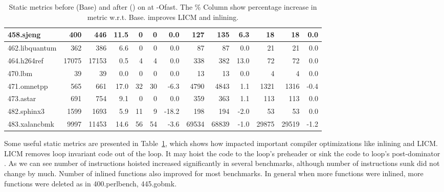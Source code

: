 \documentclass[acmlarge,review,anonymous]{acmart}\settopmatter{printfolios=true}
\begin{document}
\begin{table}[h!]
\begin{center}
{\begin{tabular}{|l|r|r|r|r|r|r|r|r|r|r|r|r|}
 458.sjeng	  & 400	        & 446	& 11.5& 0	& 0	& 0.0  & 127	& 135	  & 6.3 & 18	& 18	& 0.0  \\\hline
 462.libquantum   & 362	        & 386	& 6.6 & 0 	& 0	& 0.0  & 87	& 87	  & 0.0 & 21	& 21	& 0.0  \\\hline
 464.h264ref	  & 17075	& 17153	& 0.5 & 4	& 4	& 0.0  & 338	& 382	  & 13.0& 72	& 72	& 0.0  \\\hline
 470.lbm	  & 39	        & 39	& 0.0 & 0	& 0	& 0.0  & 13	& 13	  & 0.0 & 4	& 4	& 0.0  \\\hline
 471.omnetpp	  & 565	        & 661	& 17.0& 32	& 30	& -6.3 & 4790	& 4843	  & 1.1 & 1321	& 1316	& -0.4 \\\hline
 473.astar	  & 691	        & 754	& 9.1 & 0	& 0	& 0.0  & 359	& 363	  & 1.1 & 113	& 113	& 0.0  \\\hline
 482.sphinx3	  & 1599	& 1693	& 5.9 & 11	& 9	& -18.2& 198	& 194	  & -2.0& 53	& 53	& 0.0  \\\hline
 483.xalancbmk	  & 9997	& 11453	& 14.6& 56	& 54	& -3.6 & 69534	& 68839	  & -1.0& 29875	& 29519	& -1.2 \\\hline
    \end{tabular}}
  \end{center}
  \caption{Static metrics before (Base) and after \gcm{} (\GCM{}) on
    \SPEC{} at -Ofast. The \% Column show percentage increase in metric
    w.r.t. Base. \GCM{} improves LICM and inlining.}
  \label{tab:stats}
\end{table}

Some useful static metrics are presented in Table~\ref{tab:stats}, which shows how \gcm{}
impacted important compiler optimizations like inlining and LICM. LICM removes loop invariant
code out of the loop. It may hoist the code to the loop's preheader or sink the code to loop's
post-dominator \cite{steven1997advanced}. As we can see number of instructions hoisted increased
significantly in several benchmarks, although number of instructions sunk did not change by much.
Number of inlined functions also improved for most benchmarks. In general when more functions
were inlined, more functions were deleted as in 400.perlbench, 445.gobmk.
\end{document}
